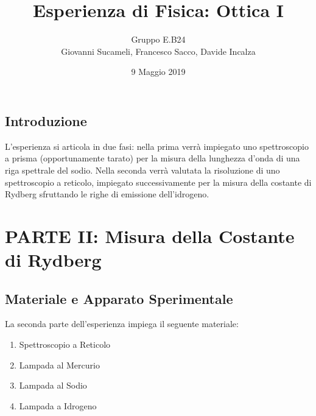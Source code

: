 \documentclass[10pt,a4paper]{article}
\author{Gruppo E.B24 \\ Giovanni Sucameli, Francesco Sacco, Davide Incalza}
\title{Esperienza di Fisica: Ottica I}
\begin{document}
	\date{9 Maggio 2019}
	\maketitle
    \begin{center}
		\subsection*{Introduzione}
		L'esperienza si articola in due fasi: nella prima verrà impiegato uno spettroscopio a prisma (opportunamente tarato) per la misura della lunghezza d'onda di una riga spettrale del sodio. Nella seconda verrà valutata la risoluzione di uno spettroscopio a reticolo, impiegato successivamente per la misura della costante di Rydberg sfruttando le righe di emissione dell'idrogeno.
	\end{center}


\section*{PARTE II: Misura della Costante di Rydberg}
	\subsection*{Materiale e Apparato Sperimentale}
		La seconda parte dell'esperienza impiega il seguente materiale:
		\begin{enumerate}
		    \item Spettroscopio a Reticolo
		    \item Lampada al Mercurio
		    \item Lampada al Sodio
		    \item Lampada a Idrogeno
		\end{enumerate}
\end{document}
